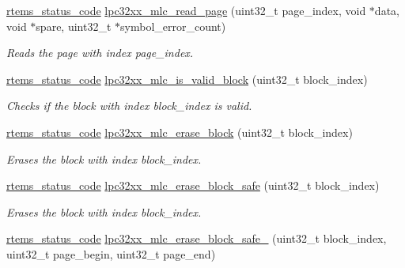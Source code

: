 \begin{DoxyCompactItemize}
\item 
\mbox{\hyperlink{group__ClassicStatus_ga545d41846817eaba6143d52ee4d9e9fe}{rtems\+\_\+status\+\_\+code}} \mbox{\hyperlink{group__lpc32xx__nand__mlc_gad998b76b7200ed71c4a99422ae2f036c}{lpc32xx\+\_\+mlc\+\_\+read\+\_\+page}} (uint32\+\_\+t page\+\_\+index, void $\ast$data, void $\ast$spare, uint32\+\_\+t $\ast$symbol\+\_\+error\+\_\+count)
\begin{DoxyCompactList}\small\item\em Reads the page with index {\itshape page\+\_\+index}. \end{DoxyCompactList}\item 
\mbox{\hyperlink{group__ClassicStatus_ga545d41846817eaba6143d52ee4d9e9fe}{rtems\+\_\+status\+\_\+code}} \mbox{\hyperlink{group__lpc32xx__nand__mlc_gad2e1dff4507a4ba350d817a1493cad5f}{lpc32xx\+\_\+mlc\+\_\+is\+\_\+valid\+\_\+block}} (uint32\+\_\+t block\+\_\+index)
\begin{DoxyCompactList}\small\item\em Checks if the block with index {\itshape block\+\_\+index} is valid. \end{DoxyCompactList}\item 
\mbox{\hyperlink{group__ClassicStatus_ga545d41846817eaba6143d52ee4d9e9fe}{rtems\+\_\+status\+\_\+code}} \mbox{\hyperlink{group__lpc32xx__nand__mlc_ga602a6e700d0e763ba5ca98874b92f926}{lpc32xx\+\_\+mlc\+\_\+erase\+\_\+block}} (uint32\+\_\+t block\+\_\+index)
\begin{DoxyCompactList}\small\item\em Erases the block with index {\itshape block\+\_\+index}. \end{DoxyCompactList}\item 
\mbox{\hyperlink{group__ClassicStatus_ga545d41846817eaba6143d52ee4d9e9fe}{rtems\+\_\+status\+\_\+code}} \mbox{\hyperlink{group__lpc32xx__nand__mlc_gab3b2378535527c368dd10f78a4eca68c}{lpc32xx\+\_\+mlc\+\_\+erase\+\_\+block\+\_\+safe}} (uint32\+\_\+t block\+\_\+index)
\begin{DoxyCompactList}\small\item\em Erases the block with index {\itshape block\+\_\+index}. \end{DoxyCompactList}\item 
\mbox{\hyperlink{group__ClassicStatus_ga545d41846817eaba6143d52ee4d9e9fe}{rtems\+\_\+status\+\_\+code}} \mbox{\hyperlink{group__lpc32xx__nand__mlc_gab7abd0702699aa8db9c2acb4eb55258c}{lpc32xx\+\_\+mlc\+\_\+erase\+\_\+block\+\_\+safe\+\_}} (uint32\+\_\+t block\+\_\+index, uint32\+\_\+t page\+\_\+begin, uint32\+\_\+t page\+\_\+end)

\end{DoxyCompactItemize}
